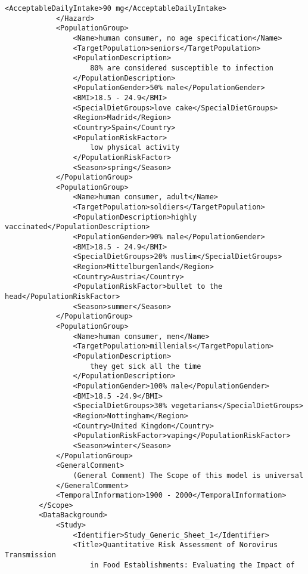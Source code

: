 \documentclass[a4paper]{report}
\begin{document}
\begin{lstlisting}[language=RAKIP, caption={Example of StudySample}]
                <AcceptableDailyIntake>90 mg</AcceptableDailyIntake>
            </Hazard>
            <PopulationGroup>
                <Name>human consumer, no age specification</Name>
                <TargetPopulation>seniors</TargetPopulation>
                <PopulationDescription>
                    80% are considered susceptible to infection
                </PopulationDescription>
                <PopulationGender>50% male</PopulationGender>
                <BMI>18.5 - 24.9</BMI>
                <SpecialDietGroups>love cake</SpecialDietGroups>
                <Region>Madrid</Region>
                <Country>Spain</Country>
                <PopulationRiskFactor>
                    low physical activity
                </PopulationRiskFactor>
                <Season>spring</Season>
            </PopulationGroup>
            <PopulationGroup>
                <Name>human consumer, adult</Name>
                <TargetPopulation>soldiers</TargetPopulation>
                <PopulationDescription>highly vaccinated</PopulationDescription>
                <PopulationGender>90% male</PopulationGender>
                <BMI>18.5 - 24.9</BMI>
                <SpecialDietGroups>20% muslim</SpecialDietGroups>
                <Region>Mittelburgenland</Region>
                <Country>Austria</Country>
                <PopulationRiskFactor>bullet to the head</PopulationRiskFactor>
                <Season>summer</Season>
            </PopulationGroup>
            <PopulationGroup>
                <Name>human consumer, men</Name>
                <TargetPopulation>millenials</TargetPopulation>
                <PopulationDescription>
                    they get sick all the time
                </PopulationDescription>
                <PopulationGender>100% male</PopulationGender>
                <BMI>18.5 -24.9</BMI>
                <SpecialDietGroups>30% vegetarians</SpecialDietGroups>
                <Region>Nottingham</Region>
                <Country>United Kingdom</Country>
                <PopulationRiskFactor>vaping</PopulationRiskFactor>
                <Season>winter</Season>
            </PopulationGroup>
            <GeneralComment>
                (General Comment) The Scope of this model is universal
            </GeneralComment>
            <TemporalInformation>1900 - 2000</TemporalInformation>
        </Scope>
        <DataBackground>
            <Study>
                <Identifier>Study_Generic_Sheet_1</Identifier>
                <Title>Quantitative Risk Assessment of Norovirus Transmission
                    in Food Establishments: Evaluating the Impact of

\end{lstlisting}
\end{document}
